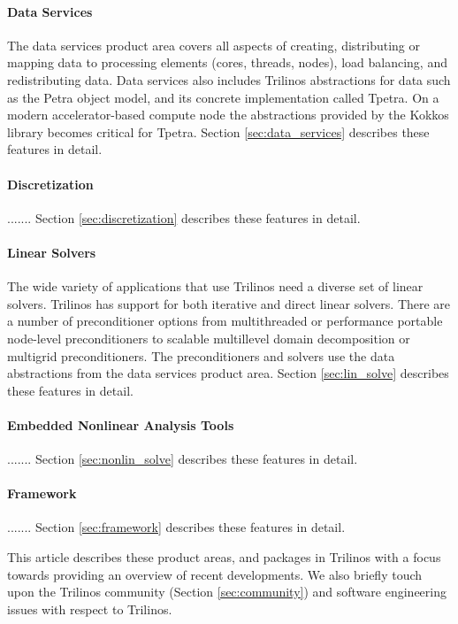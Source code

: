 \paragraph{Data Services} The data services product area covers all aspects of creating, distributing or mapping data to processing elements (cores, threads, nodes), load balancing, and redistributing data. Data services also includes Trilinos abstractions for data such as the Petra object model, and its concrete implementation called Tpetra. On a modern accelerator-based compute node the abstractions provided by the Kokkos library becomes critical for Tpetra. Section \ref{sec:data_services} describes these features in detail.
 
\paragraph{Discretization}  ....... Section \ref{sec:discretization} describes these features in detail.


\paragraph{Linear Solvers} The wide variety of applications that use Trilinos need a diverse set of linear solvers. Trilinos has support for both iterative and direct linear solvers. There are a number of preconditioner options from multithreaded or performance portable node-level preconditioners to scalable multillevel domain decomposition or multigrid preconditioners. The preconditioners and solvers use the data abstractions from the data services product area. Section \ref{sec:lin_solve} describes these features in detail.

\paragraph{Embedded Nonlinear Analysis Tools}  ....... Section \ref{sec:nonlin_solve} describes these features in detail.

\paragraph{Framework}  ....... Section \ref{sec:framework} describes these features in detail.

This article describes these product areas, and packages in Trilinos with a focus towards providing an overview of recent developments. We also briefly touch upon the Trilinos community (Section \ref{sec:community}) and software engineering issues with respect to Trilinos.